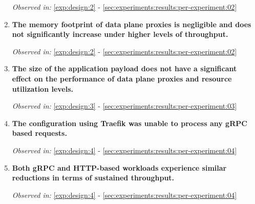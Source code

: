 \begin{enumerate}[label=\textbf{MF\arabic*}, leftmargin=3\parindent]
    \textit{Observed in:} \ref{exp:design:2} -  \cref{sec:experiments:results:per-experiment:02}
    
    \item \textbf{The memory footprint of data plane proxies is negligible and does not significantly increase under higher levels of throughput.}
    \label{exp:mf8}
    
    \textit{Observed in:} \ref{exp:design:2} -  \cref{sec:experiments:results:per-experiment:02}
    
    \item \textbf{The size of the application payload does not have a significant effect on the performance of data plane proxies and resource utilization levels.}
    \label{exp:mf9}
    
    \textit{Observed in:} \ref{exp:design:3} -  \cref{sec:experiments:results:per-experiment:03}
    
    \item \textbf{The configuration using Traefik was unable to process any gRPC based requests.}
    \label{exp:mf10}
    
    \textit{Observed in:} \ref{exp:design:4} -  \cref{sec:experiments:results:per-experiment:04}
    
    \item \textbf{Both gRPC and HTTP-based workloads experience similar reductions in terms of sustained throughput.}
    \label{exp:mf11}
    
    \textit{Observed in:} \ref{exp:design:4} -  \cref{sec:experiments:results:per-experiment:04}
 
\end{enumerate}





